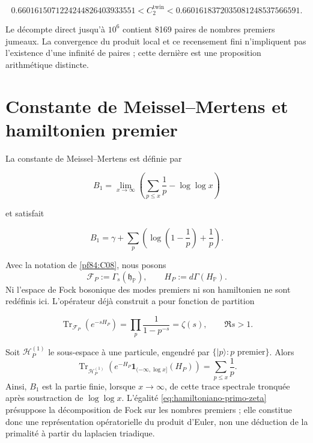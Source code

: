 \begin{equation}
 0.6601615071224244826403933551
 <C_2^{\mathrm{twin}}<
 0.6601618372035081248537566591.
 \label{eq:intervalo-primos-gemelos}
\end{equation}

Le décompte direct jusqu'à $10^6$ contient 8169 paires de nombres premiers jumeaux. La
convergence du produit local et ce recensement fini n'impliquent pas
l'existence d'une infinité de paires ; cette dernière est une proposition arithmétique
distincte.

\section{Constante de Meissel--Mertens et hamiltonien premier}

La constante de Meissel--Mertens est définie par

\begin{equation}
 B_1=\lim_{x\to\infty}
 \left(\sum_{p\leq x}\frac1p-\log\log x\right)
 \label{eq:meissel-mertens-def}
\end{equation}

et satisfait

\begin{equation}
 B_1=\gamma+
 \sum_p\left(\log\!\left(1-\frac1p\right)+\frac1p\right).
 \label{eq:meissel-mertens-euler}
\end{equation}

Avec la notation de \cref{pf84:C08}, nous posons
\[
 \mathcal F_P:=\Gamma_s(\mathfrak h_{\mathbb P}),
 \qquad
 H_P:=d\Gamma(H_{\mathbb P}).
\]
Ni l'espace de Fock bosonique des modes premiers ni son hamiltonien ne sont redéfinis ici.
L'opérateur déjà construit a pour fonction de partition

\begin{equation}
 \operatorname{Tr}_{\mathcal F_P}(e^{-sH_P})
 =\prod_p\frac1{1-p^{-s}}
 =\zeta(s),
 \qquad \Re s>1.
 \label{eq:hamiltoniano-primo-zeta}
\end{equation}

Soit \(\mathcal H_P^{(1)}\) le sous-espace à une particule, engendré par
\(\{|p\rangle:p\text{ premier}\}\). Alors
\[
 \operatorname{Tr}_{\mathcal H_P^{(1)}}\!\left(
 e^{-H_P}\mathbf 1_{(-\infty,\log x]}(H_P)\right)
 =\sum_{p\leq x}\frac1p.
\]
Ainsi, \(B_1\) est la partie finie, lorsque \(x\to\infty\), de cette trace
spectrale tronquée après soustraction de \(\log\log x\). L'égalité
\eqref{eq:hamiltoniano-primo-zeta} présuppose la décomposition de Fock sur
les nombres premiers ; elle constitue donc une représentation opératorielle du produit
d'Euler, non une déduction de la primalité à partir du laplacien
triadique.

